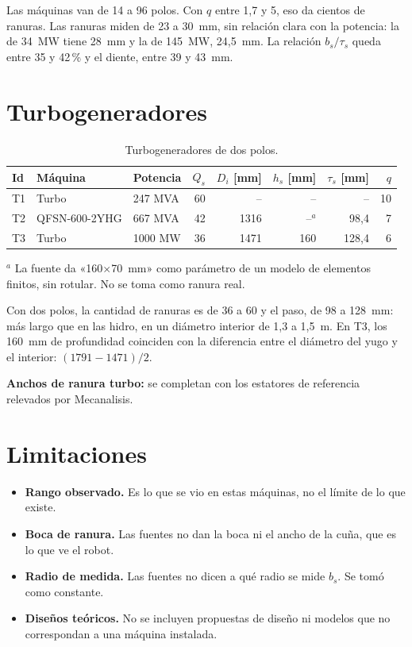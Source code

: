 \documentclass[11pt,a4paper]{article}
\begin{document}
Las máquinas van de 14 a 96 polos. Con $q$ entre 1,7 y 5, eso da cientos de
ranuras. Las ranuras miden de 23 a 30~mm, sin relación clara con la potencia: la
de 34~MW tiene 28~mm y la de 145~MW, 24,5~mm. La relación $b_s/\tau_s$ queda
entre 35 y 42\,\% y el diente, entre 39 y 43~mm.

\section{Turbogeneradores}

\begin{table}[H]\centering
\caption{Turbogeneradores de dos polos.}
\label{tab:turbo}
\footnotesize
\begin{tabular}{l l l r r r r r}
\toprule
Id & Máquina & Potencia & $Q_s$ & $D_i$ [mm] & $h_s$ [mm] & $\tau_s$ [mm] & $q$ \\
\midrule
T1 & Turbo & 247 MVA & 60 & -- & -- & -- & 10 \\
T2 & QFSN-600-2YHG & 667 MVA & 42 & 1316 & --$^{a}$ & 98,4 & 7 \\
T3 & Turbo & 1000 MW & 36 & 1471 & 160 & 128,4 & 6 \\
\bottomrule
\end{tabular}
\par\smallskip\begin{minipage}{0.75\linewidth}\footnotesize
$^{a}$ La fuente da «160$\times$70~mm» como parámetro de un modelo de elementos
finitos, sin rotular. No se toma como ranura real.
\end{minipage}
\end{table}

Con dos polos, la cantidad de ranuras es de 36 a 60 y el paso, de 98 a 128~mm:
más largo que en las hidro, en un diámetro interior de 1,3 a 1,5~m. En T3, los
160~mm de profundidad coinciden con la diferencia entre el diámetro del yugo
y el interior: $(1791-1471)/2$.

\textbf{Anchos de ranura turbo:} se completan con los estatores de referencia
relevados por Mecanalisis.

\section{Limitaciones}
\begin{itemize}
  \item \textbf{Rango observado.} Es lo que se vio en estas máquinas, no el
    límite de lo que existe.
  \item \textbf{Boca de ranura.} Las fuentes no dan la boca ni el ancho de la
    cuña, que es lo que ve el robot.
  \item \textbf{Radio de medida.} Las fuentes no dicen a qué radio se mide $b_s$.
    Se tomó como constante.
  \item \textbf{Diseños teóricos.} No se incluyen propuestas de diseño ni
    modelos que no correspondan a una máquina instalada.
\end{itemize}
\end{document}
